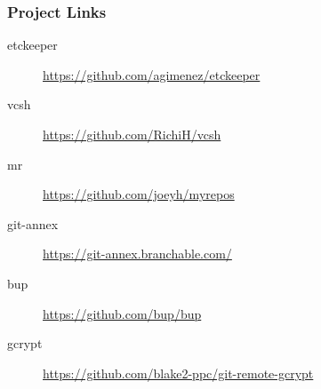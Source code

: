 \documentclass[english,hyperref={pdfpagelabels=false},aspectratio=169]{beamer}
\begin{document}
% 
% 


\begin{frame}
  \frametitle{Project Links}
  \begin{description}
    \item[etckeeper] \url{https://github.com/agimenez/etckeeper}
    \item[vcsh] \url{https://github.com/RichiH/vcsh}
    \item[mr] \url{https://github.com/joeyh/myrepos}
    \item[git-annex] \url{https://git-annex.branchable.com/}
    \item[bup] \url{https://github.com/bup/bup}
    \item[gcrypt] \url{https://github.com/blake2-ppc/git-remote-gcrypt}
  \end{description}
\end{frame}
\end{document}
